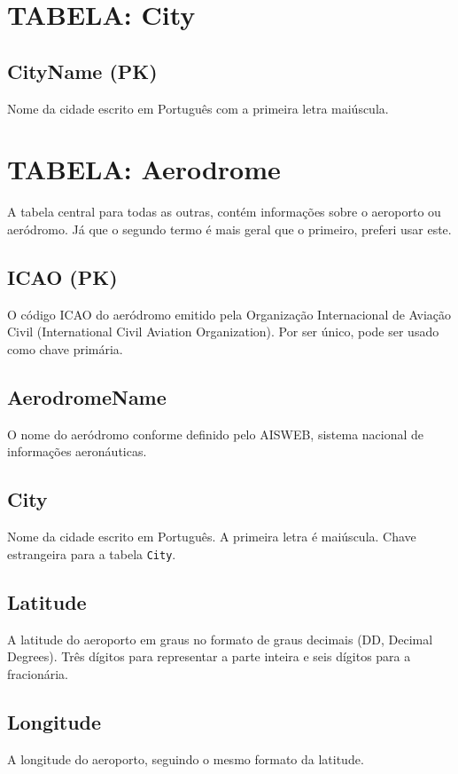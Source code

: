\section{TABELA: City}
\subsection{CityName (PK)}

Nome da cidade escrito em Português com a primeira letra maiúscula.


\section{TABELA: Aerodrome}

A tabela central para todas as outras, contém informações sobre o aeroporto ou aeródromo. 
Já que o segundo termo é mais geral que o primeiro, preferi usar este.

\subsection{ICAO (PK)}
O código ICAO do aeródromo emitido pela Organização Internacional de Aviação Civil 
(International Civil Aviation Organization). Por ser único, pode ser usado como chave primária.

\subsection{AerodromeName}
O nome do aeródromo conforme definido pelo AISWEB, sistema nacional de informações aeronáuticas.

\subsection{City}
Nome da cidade escrito em Português. A primeira letra é maiúscula.
Chave estrangeira para a tabela \texttt{City}.

\subsection{Latitude}
A latitude do aeroporto em graus no formato de graus decimais (DD, Decimal Degrees). Três dígitos 
para representar a parte inteira e seis dígitos para a fracionária.

\subsection{Longitude}
A longitude do aeroporto, seguindo o mesmo formato da latitude.

